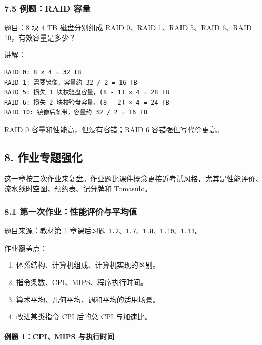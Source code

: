 \documentclass[
]{ctexart}
\newcommand{\passthrough}[1]{#1}
\providecommand{\tightlist}{%
  \setlength{\itemsep}{0pt}\setlength{\parskip}{0pt}}
\begin{document}
\subsubsection{7.5 例题：RAID 容量}\label{ux4f8bux9898raid-ux5bb9ux91cf}

题目：8 块 4 TB 磁盘分别组成 RAID 0、RAID 1、RAID 5、RAID 6、RAID
10，有效容量是多少？

讲解：

\begin{lstlisting}
RAID 0: 8 × 4 = 32 TB
RAID 1: 需要镜像，容量约 32 / 2 = 16 TB
RAID 5: 损失 1 块校验盘容量，(8 - 1) × 4 = 28 TB
RAID 6: 损失 2 块校验盘容量，(8 - 2) × 4 = 24 TB
RAID 10: 镜像后条带，容量约 32 / 2 = 16 TB
\end{lstlisting}

RAID 0 容量和性能高，但没有容错；RAID 6 容错强但写代价更高。

\subsection{8. 作业专题强化}\label{ux4f5cux4e1aux4e13ux9898ux5f3aux5316}

这一章按三次作业来复盘。作业题比课件概念更接近考试风格，尤其是性能评价、流水线时空图、预约表、记分牌和
Tomasulo。

\subsubsection{8.1
第一次作业：性能评价与平均值}\label{ux7b2cux4e00ux6b21ux4f5cux4e1aux6027ux80fdux8bc4ux4ef7ux4e0eux5e73ux5747ux503c}

题目来源：教材第 1 章课后习题
\passthrough{\lstinline!1.2、1.7、1.8、1.10、1.11!}。

作业覆盖点：

\begin{enumerate}
\def\labelenumi{\arabic{enumi}.}
\tightlist
\item
  体系结构、计算机组成、计算机实现的区别。
\item
  指令条数、CPI、MIPS、程序执行时间。
\item
  算术平均、几何平均、调和平均的适用场景。
\item
  改进某类指令 CPI 后的总 CPI 与加速比。
\end{enumerate}

\paragraph{例题 1：CPI、MIPS
与执行时间}\label{ux4f8bux9898-1cpimips-ux4e0eux6267ux884cux65f6ux95f4}
\end{document}

